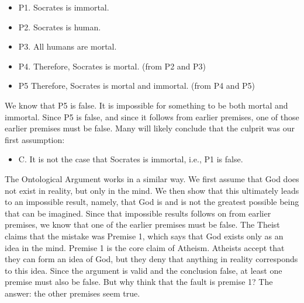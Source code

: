 \documentclass[]{article}
\begin{document}
\begin{itemize}
\itemsep1pt\parskip0pt
\item
  P1. Socrates is immortal.
\item
  P2. Socrates is human.
\item
  P3. All humans are mortal.
\item
  P4. Therefore, Socrates is mortal. (from P2 and P3)
\item
  P5 Therefore, Socrates is mortal and immortal. (from P4 and P5)
\end{itemize}

We know that P5 is false. It is impossible for something to be both
mortal and immortal. Since P5 is false, and since it follows from
earlier premises, one of those earlier premises must be false. Many will
likely conclude that the culprit was our first assumption:

\begin{itemize}
\itemsep1pt\parskip0pt
\item
  C. It is not the case that Socrates is immortal, i.e., P1 is false.
\end{itemize}

The Ontological Argument works in a similar way. We first assume that
God does not exist in reality, but only in the mind. We then show that
this ultimately leads to an impossible result, namely, that God is and
is not the greatest possible being that can be imagined. Since that
impossible results follows on from earlier premises, we know that one of
the earlier premises must be false. The Theist claims that the mistake
was Premise 1, which says that God exists only as an idea in the mind.
Premise 1 is the core claim of Atheism. Atheists accept that they can
form an idea of God, but they deny that anything in reality corresponds
to this idea. Since the argument is valid and the conclusion false, at
least one premise must also be false. But why think that the fault is
premise 1? The answer: the other premises seem true.
\end{document}
